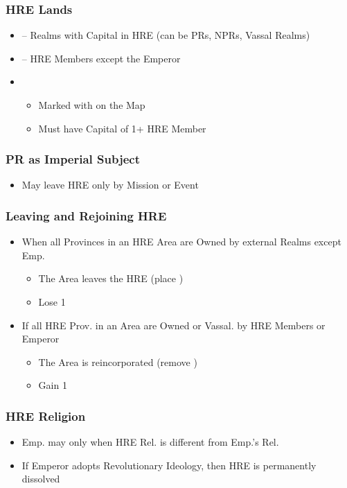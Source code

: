 \documentclass[10pt]{article}
\begin{document}
\subsubsection*{HRE Lands }
\begin{itemize}
	\item {} -- Realms with Capital in HRE (can be PRs, NPRs, Vassal Realms)
	\item {} -- HRE Members except the Emperor
	\item {}
	\begin{itemize}
		\item Marked with \authority on the Map
		\item Must have Capital of 1+ HRE Member
	\end{itemize}
\end{itemize}

\subsubsection*{PR as Imperial Subject }
\begin{itemize}
	\item May leave HRE only by Mission or Event
\end{itemize}

\subsubsection*{Leaving and Rejoining HRE }
\begin{itemize}
	\item When all Provinces in an HRE Area are Owned by external Realms except Emp.
	\begin{itemize}
		\item The Area leaves the HRE (place \nothre)
		\item Lose 1\authority
	\end{itemize}
	\item If all HRE Prov. in an Area are Owned or Vassal. by HRE Members or Emperor
	\begin{itemize}
		\item The Area is reincorporated (remove \nothre)
		\item Gain 1\authority
	\end{itemize}
\end{itemize}

\subsubsection*{HRE Religion }
\begin{itemize}
	\item Emp. may  only when HRE Rel. is different from Emp.'s Rel.
	\item If Emperor adopts Revolutionary Ideology, then HRE is permanently dissolved
\end{itemize}
\end{document}
